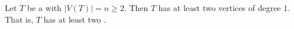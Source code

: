 \begin{proposition} \label{proposition:every_tree_has_a_vertex_of_degree_one_for_n_greater_than_one}
Let $T$ be a  with $|V(T)| = n \geq 2$. Then $T$ has at least two vertices of degree 1. That is, $T$ has at least two .
\end{proposition}
